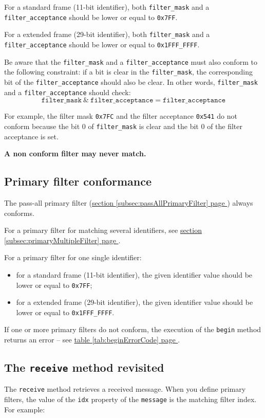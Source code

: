 \documentclass[10pt, a4paper, obeyspaces, openany]{extarticle}
\newcommand \subsectionLabel[2]{\subsection{#1}\label{subsec:#2}}
\newcommand\refSubsectionPage[1]{\hyperref[subsec:#1]{section \ref*{subsec:#1} page \pageref{subsec:#1}}}
\newcommand\refTableauPage[1]{\hyperref[tab:#1]{table \ref*{tab:#1} page \pageref{tab:#1}}}
\begin{document}
For a standard frame (11-bit identifier), both \texttt{filter\_mask} and a \texttt{filter\_acceptance} should be lower or equal to \texttt{0x7FF}.

For a extended frame (29-bit identifier), both \texttt{filter\_mask} and a \texttt{filter\_acceptance} should be lower or equal to \texttt{0x1FFF\_FFFF}.

Be aware that the \texttt{filter\_mask} and a \texttt{filter\_acceptance} must also conform to the following constraint: if a bit is clear in the \texttt{filter\_mask}, the corresponding bit of the \texttt{filter\_acceptance} should also be clear. In other words, \texttt{filter\_mask} and a \texttt{filter\_acceptance} should check:
\begin{equation*}
  \texttt{filter\_mask}~\&~\texttt{filter\_acceptance} = \texttt{filter\_acceptance}
\end{equation*}

For example, the filter mask \texttt{0x7FC} and the filter acceptance \texttt{0x541} do not conform because the bit 0 of \texttt{filter\_mask} is clear and the bit 0 of the filter acceptance is set.

{\bf A non conform filter may never match.}




\subsectionLabel{Primary filter conformance}{primaryFilterConformance}

The pass-all primary filter (\refSubsectionPage{passAllPrimaryFilter}) always conforms.

For a primary filter for matching several identifiers, see \refSubsectionPage{primaryMultipleFilter}.

For a primary filter for one single identifier:
\begin{itemize}
  \item for a standard frame (11-bit identifier), the given identifier value should be lower or equal to \texttt{0x7FF};
  \item for a extended frame (29-bit identifier), the given identifier value should be lower or equal to \texttt{0x1FFF\_FFFF}.
\end{itemize}

If one or more primary filters do not conform, the execution of the \texttt{begin} method returns an error -- see \refTableauPage{beginErrorCode}.


\subsectionLabel{The \texttt{receive} method revisited}{usingIDXvalue}

The \texttt{receive} method retrieves a received message. When you define primary filters, the value of the \texttt{idx} property of the \texttt{message} is the matching filter index. For example:
\end{document}
